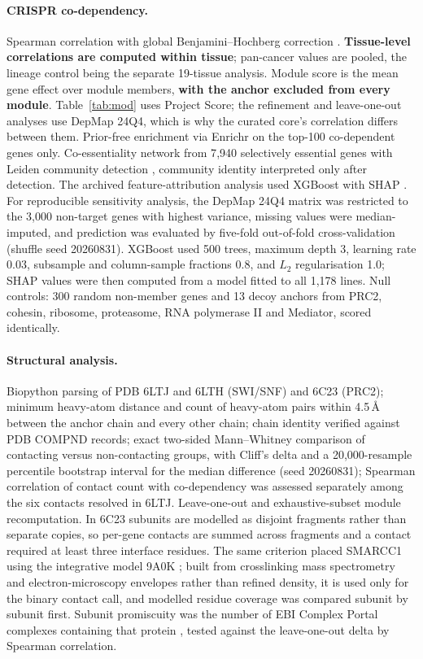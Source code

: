 \documentclass[11pt,a4paper]{article}
\begin{document}
\paragraph{CRISPR co-dependency.} Spearman correlation with global
Benjamini--Hochberg correction \citep{benjamini1995}. \textbf{Tissue-level
correlations are computed within tissue}; pan-cancer values are pooled, the
lineage control being the separate 19-tissue analysis. Module score is the mean
gene effect over module members, \textbf{with the anchor excluded from every
module}. Table~\ref{tab:mod} uses Project Score; the refinement and leave-one-out
analyses use DepMap 24Q4, which is why the curated core's correlation differs
between them. Prior-free
enrichment via Enrichr \citep{xie2021} on the top-100 co-dependent genes only.
Co-essentiality network from 7{,}940 selectively essential genes with Leiden
community detection \citep{traag2019}, community identity interpreted only after
detection. The archived feature-attribution analysis used XGBoost with SHAP
\citep{lundberg2020}. For reproducible sensitivity analysis, the DepMap 24Q4
matrix was restricted to the 3{,}000 non-target genes with highest variance,
missing values were median-imputed, and prediction was evaluated by five-fold
out-of-fold cross-validation (shuffle seed 20260831). XGBoost used 500 trees,
maximum depth 3, learning rate 0.03, subsample and column-sample fractions 0.8,
and $L_2$ regularisation 1.0; SHAP values were then computed from a model fitted
to all 1{,}178 lines. Null controls: 300 random non-member genes and 13 decoy
anchors from PRC2, cohesin, ribosome, proteasome, RNA polymerase II and Mediator,
scored identically.

\paragraph{Structural analysis.} Biopython \citep{cock2009} parsing of PDB 6LTJ
and 6LTH (SWI/SNF) and 6C23 (PRC2); minimum heavy-atom distance and count of
heavy-atom pairs within 4.5\,\AA{} between the anchor chain and every other chain;
chain identity verified against PDB COMPND records; exact two-sided
Mann--Whitney comparison of contacting versus non-contacting groups, with
Cliff's delta and a 20{,}000-resample percentile bootstrap interval for the
median difference (seed 20260831);
Spearman correlation of contact count with co-dependency was assessed separately
among the six contacts resolved in 6LTJ. Leave-one-out and
exhaustive-subset module recomputation. In 6C23 subunits are modelled as disjoint
fragments rather than separate copies, so per-gene contacts are summed across
fragments and a contact required at least three interface residues. The same
criterion placed SMARCC1 using the integrative model 9A0K \citep{mashtalir2020};
built from crosslinking mass spectrometry and electron-microscopy envelopes
rather than refined density, it is used only for the binary contact call, and
modelled residue coverage was compared subunit by subunit first. Subunit promiscuity was the number of EBI Complex Portal
complexes containing that protein \citep{meldal2022}, tested against the
leave-one-out delta by Spearman correlation.
\end{document}
